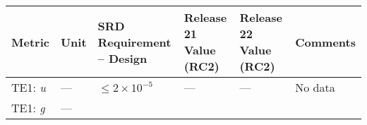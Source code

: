 \documentclass[DM, lsstdraft, toc]{lsstdoc}
\begin{document}
\begin{longtable}[]{@{}llllll@{}}
\toprule
\begin{minipage}[b]{0.12\columnwidth}\raggedright\strut
Metric\strut
\end{minipage} & \begin{minipage}[b]{0.06\columnwidth}\raggedright\strut
Unit\strut
\end{minipage} & \begin{minipage}[b]{0.14\columnwidth}\raggedright\strut
SRD Requirement -- Design\strut
\end{minipage} & \begin{minipage}[b]{0.12\columnwidth}\raggedright\strut
Release 21 Value (RC2) \strut
\end{minipage} & \begin{minipage}[b]{0.12\columnwidth}\raggedright\strut
Release 22 Value (RC2) \strut
\end{minipage} & \begin{minipage}[b]{0.17\columnwidth}\raggedright\strut
Comments\strut
\end{minipage}\tabularnewline
\midrule
\endhead
\begin{minipage}[t]{0.12\columnwidth}\raggedright\strut
TE1: \emph{u}\strut
\end{minipage} & \begin{minipage}[t]{0.06\columnwidth}\raggedright\strut
---\strut
\end{minipage} & \begin{minipage}[t]{0.14\columnwidth}\raggedright\strut
\(\leq 2\times10^{-5}\)\strut
\end{minipage} & \begin{minipage}[t]{0.12\columnwidth}\raggedright\strut
---\strut
\end{minipage} & \begin{minipage}[t]{0.12\columnwidth}\raggedright\strut
--- \strut
\end{minipage} & \begin{minipage}[t]{0.17\columnwidth}\raggedright\strut
No data\strut
\end{minipage}\tabularnewline
\begin{minipage}[t]{0.12\columnwidth}\raggedright\strut
TE1: \emph{g}\strut
\end{minipage} & \begin{minipage}[t]{0.06\columnwidth}\raggedright\strut
---\strut
\end{minipage} & \begin{minipage}[t]{0.14\columnwidth}\raggedright\strut

\end{minipage}
\end{longtable}
\end{document}
